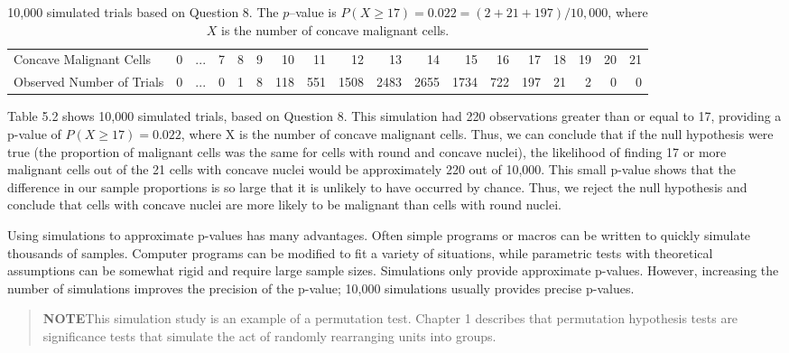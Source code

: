 \documentclass[
]{book}
\begin{document}
\begin{table}

\caption{\label{tab:tab52}10,000 simulated trials based on Question 8. The $p$–value is $P(X\ge17)=0.022=(2+21+197)/10,000$, where $X$ is the number of concave malignant cells.}
\centering
\begin{tabular}[t]{>{\raggedright\arraybackslash}p{2cm}lrrrrrrrrrrrrrrrr}
\toprule
\midrule
Concave Malignant Cells & 0 & ... & 7 & 8 & 9 & 10 & 11 & 12 & 13 & 14 & 15 & 16 & 17 & 18 & 19 & 20 & 21\\
Observed Number of Trials & 0 & ... & 0 & 1 & 8 & 118 & 551 & 1508 & 2483 & 2655 & 1734 & 722 & 197 & 21 & 2 & 0 & 0\\
\bottomrule
\end{tabular}
\end{table}

Table 5.2 shows 10,000 simulated trials, based on Question 8. This simulation had 220 observations greater than or equal to 17, providing a p-value of \(P(X \geq 17)= 0.022\), where X is the number of concave
malignant cells. Thus, we can conclude that if the null hypothesis were true (the proportion of malignant cells was the same for cells with round and concave nuclei), the likelihood of finding 17 or more malignant cells out of the 21 cells with concave nuclei would be approximately 220 out of 10,000. This small p-value shows
that the difference in our sample proportions is so large that it is unlikely to have occurred by chance. Thus, we reject the null hypothesis and conclude that cells with concave nuclei are more likely to be malignant than cells with round nuclei.

Using simulations to approximate p-values has many advantages. Often simple programs or macros can be written to quickly simulate thousands of samples. Computer programs can be modified to fit a variety of situations, while parametric tests with theoretical assumptions can be somewhat rigid and require large sample sizes. Simulations only provide approximate p-values. However, increasing the number of simulations improves the precision of the p-value; 10,000 simulations usually provides precise p-values.

\begin{quote}
\textbf{NOTE}This simulation study is an example of a permutation test. Chapter 1 describes that permutation hypothesis
tests are significance tests that simulate the act of randomly rearranging units into groups.
\end{quote}
\end{document}
